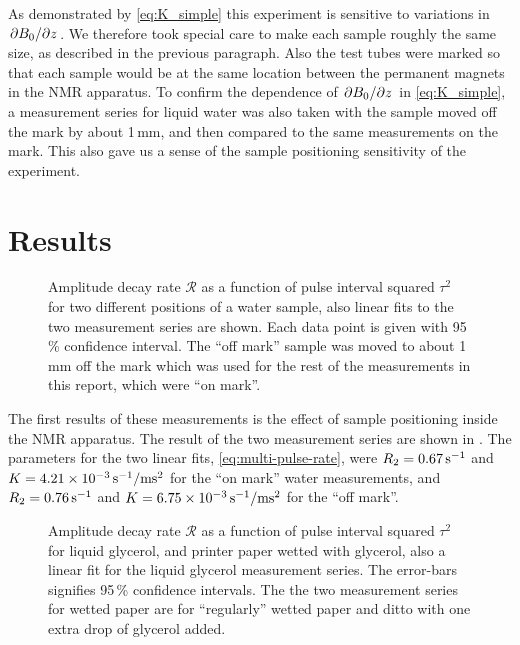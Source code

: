 \documentclass[11pt,a4paper, twocolumn,
swedish, english %
]{article}
\begin{document}
As demonstrated by \eqref{eq:K_simple} this experiment is sensitive to
variations in $\pdv*{B_0}{z}$. We therefore took special care to make
each sample roughly the same size, as described in the previous
paragraph. Also the test tubes were marked so that each sample would 
be at the same location between the permanent magnets in the NMR
apparatus. To confirm the dependence of $\pdv*{B_0}{z}$ in
\eqref{eq:K_simple}, a measurement series for liquid water was also
taken with the sample moved off the mark by about 1\,mm, and then
compared to the same measurements on the mark. This also gave us a
sense of the sample positioning sensitivity of the experiment.



\section{Results}

\begin{figure}
\centering

\caption{Amplitude decay rate $\mathcal{R}$ as a function of pulse
  interval squared $\tau^2$ for two different positions of a water
  sample, also linear fits to the two measurement series are
  shown. Each data point is given with 95\,\% confidence
  interval. The ``off mark'' sample was moved to about 1\,mm off the
  mark which was used for the rest of the measurements in this report,
  which were ``on mark''. } 
\label{fig:water-pos}
\end{figure}

The first results of these measurements is the effect of sample
positioning inside the NMR apparatus. The result of the two
measurement series are shown in .
The parameters for the two linear fits, \eqref{eq:multi-pulse-rate},
were $R_2=\unit[0.67]{s^{-1}}$ and  
$K=\unit[4.21\times10^{-3}]{s^{-1}/ms^2}$ for the ``on mark'' water
measurements, and $R_2=\unit[0.76]{s^{-1}}$ and
$K=\unit[6.75\times10^{-3}]{s^{-1}/ms^2}$ for the ``off mark''.


\begin{figure}
\centering

\caption{Amplitude decay rate $\mathcal{R}$ as a function of pulse
  interval squared $\tau^2$ for liquid glycerol, and printer paper
  wetted with glycerol, also a linear fit for the liquid glycerol
  measurement series. The error-bars signifies 95\,\% confidence
  intervals. The the two measurement series for wetted paper are for
  ``regularly'' wetted paper and ditto with one extra drop of glycerol
  added. }
\label{fig:glyc}
\end{figure}
\end{document}

